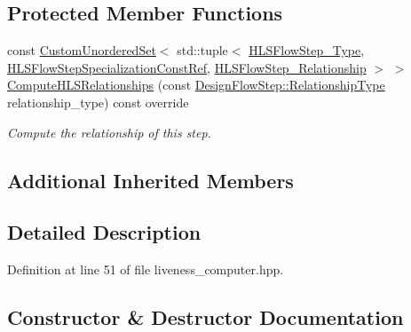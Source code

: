 \subsection*{Protected Member Functions}
\begin{DoxyCompactItemize}
\item 
const \hyperlink{classCustomUnorderedSet}{Custom\+Unordered\+Set}$<$ std\+::tuple$<$ \hyperlink{hls__step_8hpp_ada16bc22905016180e26fc7e39537f8d}{H\+L\+S\+Flow\+Step\+\_\+\+Type}, \hyperlink{hls__step_8hpp_a5fdd2edf290c196531d21d68e13f0e74}{H\+L\+S\+Flow\+Step\+Specialization\+Const\+Ref}, \hyperlink{hls__step_8hpp_a3ad360b9b11e6bf0683d5562a0ceb169}{H\+L\+S\+Flow\+Step\+\_\+\+Relationship} $>$ $>$ \hyperlink{classliveness__computer_a9b84eb26166083179eec5570e27e3d95}{Compute\+H\+L\+S\+Relationships} (const \hyperlink{classDesignFlowStep_a723a3baf19ff2ceb77bc13e099d0b1b7}{Design\+Flow\+Step\+::\+Relationship\+Type} relationship\+\_\+type) const override
\begin{DoxyCompactList}\small\item\em Compute the relationship of this step. \end{DoxyCompactList}\end{DoxyCompactItemize}
\subsection*{Additional Inherited Members}


\subsection{Detailed Description}


Definition at line 51 of file liveness\+\_\+computer.\+hpp.



\subsection{Constructor \& Destructor Documentation}
\mbox{\label{classliveness__computer_acfba7bac0a134cc6a1cc9c6d5e4974d5}} 
